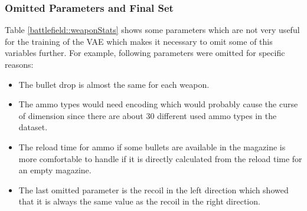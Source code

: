 \documentclass[MGS,Master,english]{twbook}%
\begin{document}
\subsubsection{Omitted Parameters and Final Set}
Table \ref{battlefield::weaponStats} shows some parameters which are not very useful for the training of the VAE which makes it necessary to omit some of this variables further. For example, following parameters were omitted for specific reasons:
\begin{itemize}
	\item The bullet drop is almost the same for each weapon.
	\item The ammo types would need encoding which would probably cause the curse of dimension since there are about 30 different used ammo types in the dataset.
	\item The reload time for ammo if some bullets are available in the magazine is more comfortable to handle if it is directly calculated from the reload time for an empty magazine.
	\item The last omitted parameter is the recoil in the left direction which showed that it is always the same value as the recoil in the right direction.
\end{itemize}
\end{document}
